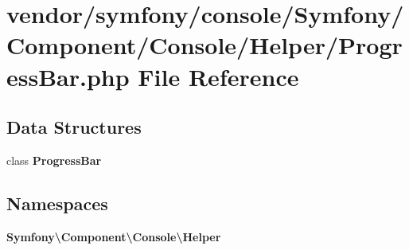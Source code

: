\section{vendor/symfony/console/\+Symfony/\+Component/\+Console/\+Helper/\+Progress\+Bar.php File Reference}
\label{_progress_bar_8php}
\subsection*{Data Structures}
\begin{DoxyCompactItemize}
\item 
class {\bf Progress\+Bar}
\end{DoxyCompactItemize}
\subsection*{Namespaces}
\begin{DoxyCompactItemize}
\item 
 {\bf Symfony\textbackslash{}\+Component\textbackslash{}\+Console\textbackslash{}\+Helper}
\end{DoxyCompactItemize}

